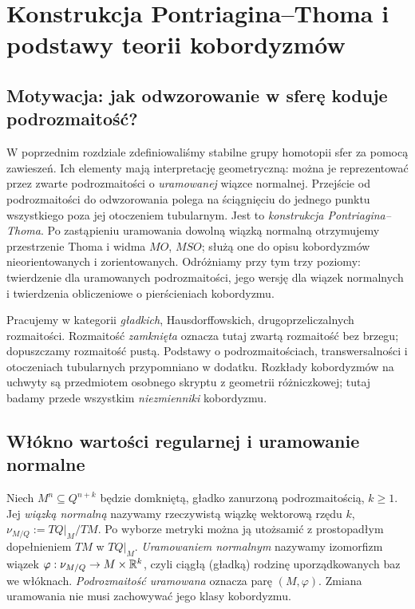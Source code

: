 \chapter{Konstrukcja Pontriagina--Thoma i podstawy teorii kobordyzmów}
\label{ch:pt-v9}

\section{Motywacja: jak odwzorowanie w sferę koduje podrozmaitość?}
W poprzednim rozdziale zdefiniowaliśmy stabilne grupy homotopii sfer
za pomocą zawieszeń. Ich elementy mają interpretację geometryczną:
można je reprezentować przez zwarte podrozmaitości o \emph{uramowanej}
wiązce normalnej. Przejście od podrozmaitości do odwzorowania
polega na ściągnięciu do jednego punktu wszystkiego poza jej
otoczeniem tubularnym. Jest to \emph{konstrukcja Pontriagina--Thoma}.
Po zastąpieniu uramowania dowolną wiązką normalną otrzymujemy
przestrzenie Thoma i widma $MO$, $MSO$; służą one do opisu
kobordyzmów nieorientowanych i zorientowanych. Odróżniamy przy tym
trzy poziomy: twierdzenie dla uramowanych podrozmaitości,
jego wersję dla wiązek normalnych i twierdzenia obliczeniowe
o pierścieniach kobordyzmu.

Pracujemy w kategorii \emph{gładkich}, Hausdorffowskich,
drugoprzeliczalnych rozmaitości. Rozmaitość \emph{zamknięta}
oznacza tutaj zwartą rozmaitość bez brzegu; dopuszczamy
rozmaitość pustą. Podstawy o podrozmaitościach, transwersalności
i otoczeniach tubularnych przypomniano w dodatku. Rozkłady
kobordyzmów na uchwyty są przedmiotem osobnego skryptu z geometrii
różniczkowej; tutaj badamy przede wszystkim \emph{niezmienniki}
kobordyzmu.

\section{Włókno wartości regularnej i uramowanie normalne}
\begin{definicja}
Niech $M^n\subseteq Q^{n+k}$ będzie domkniętą, gładko
zanurzoną podrozmaitością, $k\ge1$. Jej \emph{wiązką normalną}
nazywamy rzeczywistą wiązkę wektorową rzędu $k$,
$\nu_{M/Q}:=TQ|_M/TM$. Po wyborze metryki można ją
utożsamić z prostopadłym dopełnieniem $TM$ w $TQ|_M$.
\emph{Uramowaniem normalnym} nazywamy izomorfizm wiązek
$\varphi:\nu_{M/Q}\to M\times\mathbb{R}^k$, czyli ciągłą
(gładką) rodzinę uporządkowanych baz we włóknach.
\emph{Podrozmaitość uramowana} oznacza parę $(M,\varphi)$.
Zmiana uramowania nie musi zachowywać jego klasy kobordyzmu.
\end{definicja}

